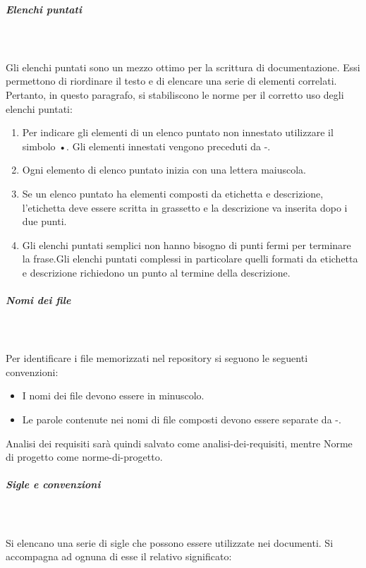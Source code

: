 \documentclass[../norme-di-progetto.tex]{subfiles}
\begin{document}
\subparagraph{Elenchi puntati}\mbox{}\\
\label{subp:elenchi puntati}
\\Gli elenchi puntati sono un mezzo ottimo per la scrittura di documentazione. Essi permettono di riordinare il testo e di elencare una serie di elementi correlati. Pertanto, in questo paragrafo, si stabiliscono le norme per il corretto uso degli elenchi puntati:
\begin{enumerate}
	\item Per indicare gli elementi di un elenco puntato non innestato utilizzare il simbolo •. Gli elementi innestati vengono preceduti da -.
	\item Ogni elemento di elenco puntato inizia con una lettera maiuscola.
	\item Se un elenco puntato ha elementi composti da etichetta e descrizione, l'etichetta deve essere scritta in grassetto e la descrizione va inserita dopo i due punti.
	\item Gli elenchi puntati semplici non hanno bisogno di punti fermi per terminare la frase.Gli elenchi puntati complessi in particolare quelli formati da etichetta e descrizione richiedono un punto al termine della descrizione.
\end{enumerate}
\subparagraph{Nomi dei file}\mbox{}\\
\label{nomi dei file}
\\Per identificare i file memorizzati nel repository si seguono le seguenti convenzioni:
\begin{itemize}
	\item I nomi dei file devono essere in minuscolo.
	\item Le parole contenute nei nomi di file composti devono essere separate da -.
\end{itemize}
Analisi dei requisiti sarà quindi salvato come analisi-dei-requisiti, mentre Norme di progetto come norme-di-progetto.
\subparagraph{Sigle e convenzioni}\mbox{}\\
\label{sigle e convenzioni}
\\Si elencano una serie di sigle che possono essere utilizzate nei documenti. Si accompagna ad ognuna di esse il relativo significato:
\end{document}
